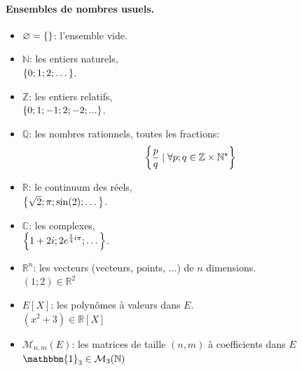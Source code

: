 \documentclass[12pt]{article}
\begin{document}
\paragraph{Ensembles de nombres usuels.}
\begin{itemize}
    \item $\varnothing = \left\{\right\}$: l'ensemble vide.
    \item[\Ii] $\mathbb{N}$: les entiers naturels, \\
        \Ex $\left\{0; 1; 2; \dots\right\}$. 
    \item[\Ii] $\mathbb{Z}$: les entiers relatifs, \\ 
        \Ex $\left\{0; 1; -1; 2; -2; ...\right\}$.
    \item $\mathbb{Q}$: les nombres rationnels, toutes les fractions: 
    $$ \left\{
        \frac{p}{q} \; | \;    
        \forall p; q \in \mathbb{Z}\times \mathbb{N}^{\star} 
    \right\} $$
    \item[\Ii] $\mathbb{R}$: le continuum des réels, \\
        \Ex $\left\{\sqrt{2}; \pi; \sin(2); \dots\right\}$.
    \item[\Ii] $\mathbb{C}$: les complexes, \\
        \Ex $\left\{1 + 2i; 2e^{\frac{1}{4}i\pi}; \dots\right\}$.
    \item $\mathbb{R}^{n}$: les vecteurs (vecteurs, points, $\dots$) de $n$ dimensions. \\
        \Ex $(1; 2) \in \mathbb{R}^2$
    \item[\Il] $E[X]$: les polynômes à valeurs dans $E$. \\
        \Ex $(x^2 + 3) \in \mathbb{R}\left[X\right]$ 
    \item[\Il] $\mathcal{M}_{n, m}(E)$: les matrices de taille $(n, m)$ 
        à coefficients dans $E$ \\
        \Ex $\mathbbm{1}_3 \in \mathcal{M}_{3}(\mathbb{N})$
\end{itemize}
\end{document}
